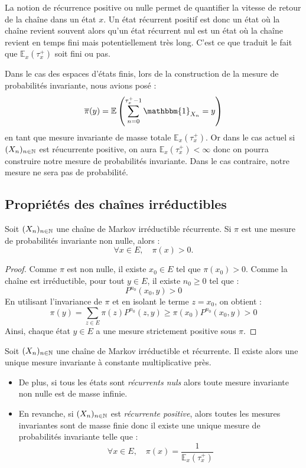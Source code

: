 La notion de récurrence positive ou nulle permet de quantifier la vitesse de retour de la chaîne dans un état $x$. 
Un état récurrent positif est donc un état où la chaîne revient souvent alors qu'un état récurrent nul est un état où 
la chaîne revient en temps fini mais potentiellement très long. 
C'est ce que traduit le fait que $ \mathbb{E}_x( \tau_x^+)$ soit fini ou pas. 

\begin{remark}
    Dans le cas des espaces d'états finis, lors de la construction de la mesure de probabilités invariante, 
    nous avions posé : 
        \[ \overline{ \pi}(y) = \mathbb{E} \left( \sum_{n=0}^{ \tau_x^+ -1} \mathbbm{1}_{X_n} = y \right) \] 
    en tant que mesure invariante de masse totale $ \mathbb{E}_x( \tau_x^+)$. Or dans le cas actuel si $(X_n)_{n \in \mathbb{N}}$ 
    est réucurrente positive, on aura $ \mathbb{E}_x( \tau_x^+) < \infty$ donc on pourra construire notre 
    mesure de probabilités invariante. Dans le cas contraire, notre mesure ne sera pas de probabilité.  
\end{remark}

\subsection{Propriétés des chaînes irréductibles}

\begin{prop}[Positivité]
    Soit $(X_n)_{n \in \mathbb{N}}$ une chaîne de Markov irréductible récurrente.  
    Si $\pi$ est une mesure de probabilités invariante non nulle, alors : 
        \[
            \forall x \in E, \quad \pi(x) > 0.
        \]
\end{prop}

\begin{proof}
    Comme $\pi$ est non nulle, il existe $x_0 \in E$ tel que $\pi(x_0) > 0$.  
    Comme la chaîne est irréductible, pour tout $y \in E$, il existe $n_0 \ge 0$ tel que :
        \[ P^{n_0}(x_0, y) > 0 \]
    En utilisant l’invariance de $\pi$ et en isolant le terme $z = x_0$, on obtient :
        \[ \pi(y) = \sum_{z \in E} \pi(z) P^{n_0}(z, y) \geqslant \pi(x_0) P^{n_0}(x_0, y) > 0 \]
    Ainsi, chaque état $y \in E$ a une mesure strictement positive sous $\pi$.
\end{proof}

\begin{theorem}[Unicité]
    Soit $(X_n)_{n \in \mathbb{N}}$ une chaîne de Markov irréductible et récurrente. Il existe alors une unique 
    mesure invariante à constante multiplicative près. 
    \begin{itemize}
        \item De plus, si tous les états sont \emph{récurrents nuls} alors toute mesure invariante non nulle est de masse infinie. 
        \item En revanche, si $(X_n)_{n \in \mathbb{N}}$ est \emph{récurrente positive}, alors toutes les mesures invariantes sont 
        de masse finie donc il existe une unique mesure de probabilités invariante telle que : 
            \[ \forall x \in E, \quad \pi(x) = \frac{1}{ \mathbb{E}_x( \tau_x^+) }  \] 
    \end{itemize}
\end{theorem}


